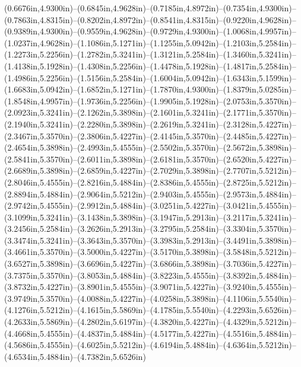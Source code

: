 (0.6676in,4.9300in)--(0.6845in,4.9628in)--(0.7185in,4.8972in)--(0.7354in,4.9300in)--(0.7863in,4.8315in)--(0.8202in,4.8972in)--(0.8541in,4.8315in)--(0.9220in,4.9628in)--(0.9389in,4.9300in)--(0.9559in,4.9628in)--(0.9729in,4.9300in)--(1.0068in,4.9957in)--(1.0237in,4.9628in)--(1.1086in,5.1271in)--(1.1255in,5.0942in)--(1.2103in,5.2584in)--(1.2273in,5.2256in)--(1.2782in,5.3241in)--(1.3121in,5.2584in)--(1.3460in,5.3241in)--(1.4138in,5.1928in)--(1.4308in,5.2256in)--(1.4478in,5.1928in)--(1.4817in,5.2584in)--(1.4986in,5.2256in)--(1.5156in,5.2584in)--(1.6004in,5.0942in)--(1.6343in,5.1599in)--(1.6683in,5.0942in)--(1.6852in,5.1271in)--(1.7870in,4.9300in)--(1.8379in,5.0285in)--(1.8548in,4.9957in)--(1.9736in,5.2256in)--(1.9905in,5.1928in)--(2.0753in,5.3570in)--(2.0923in,5.3241in)--(2.1262in,5.3898in)--(2.1601in,5.3241in)--(2.1771in,5.3570in)--(2.1940in,5.3241in)--(2.2280in,5.3898in)--(2.2619in,5.3241in)--(2.3128in,5.4227in)--(2.3467in,5.3570in)--(2.3806in,5.4227in)--(2.4145in,5.3570in)--(2.4485in,5.4227in)--(2.4654in,5.3898in)--(2.4993in,5.4555in)--(2.5502in,5.3570in)--(2.5672in,5.3898in)--(2.5841in,5.3570in)--(2.6011in,5.3898in)--(2.6181in,5.3570in)--(2.6520in,5.4227in)--(2.6689in,5.3898in)--(2.6859in,5.4227in)--(2.7029in,5.3898in)--(2.7707in,5.5212in)--(2.8046in,5.4555in)--(2.8216in,5.4884in)--(2.8386in,5.4555in)--(2.8725in,5.5212in)--(2.8894in,5.4884in)--(2.9064in,5.5212in)--(2.9403in,5.4555in)--(2.9573in,5.4884in)--(2.9742in,5.4555in)--(2.9912in,5.4884in)--(3.0251in,5.4227in)--(3.0421in,5.4555in)--(3.1099in,5.3241in)--(3.1438in,5.3898in)--(3.1947in,5.2913in)--(3.2117in,5.3241in)--(3.2456in,5.2584in)--(3.2626in,5.2913in)--(3.2795in,5.2584in)--(3.3304in,5.3570in)--(3.3474in,5.3241in)--(3.3643in,5.3570in)--(3.3983in,5.2913in)--(3.4491in,5.3898in)--(3.4661in,5.3570in)--(3.5000in,5.4227in)--(3.5170in,5.3898in)--(3.5848in,5.5212in)--(3.6527in,5.3898in)--(3.6696in,5.4227in)--(3.6866in,5.3898in)--(3.7036in,5.4227in)--(3.7375in,5.3570in)--(3.8053in,5.4884in)--(3.8223in,5.4555in)--(3.8392in,5.4884in)--(3.8732in,5.4227in)--(3.8901in,5.4555in)--(3.9071in,5.4227in)--(3.9240in,5.4555in)--(3.9749in,5.3570in)--(4.0088in,5.4227in)--(4.0258in,5.3898in)--(4.1106in,5.5540in)--(4.1276in,5.5212in)--(4.1615in,5.5869in)--(4.1785in,5.5540in)--(4.2293in,5.6526in)--(4.2633in,5.5869in)--(4.2802in,5.6197in)--(4.3820in,5.4227in)--(4.4329in,5.5212in)--(4.4668in,5.4555in)--(4.4837in,5.4884in)--(4.5177in,5.4227in)--(4.5516in,5.4884in)--(4.5686in,5.4555in)--(4.6025in,5.5212in)--(4.6194in,5.4884in)--(4.6364in,5.5212in)--(4.6534in,5.4884in)--(4.7382in,5.6526in) 